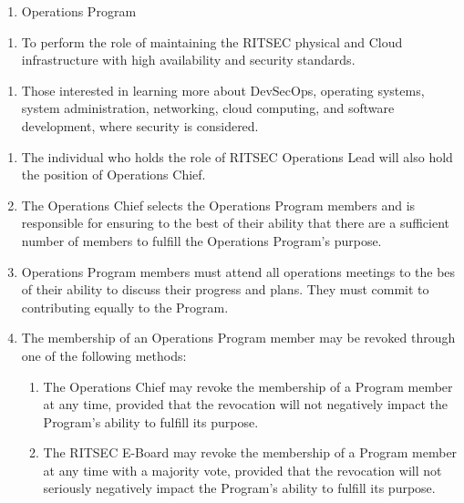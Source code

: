 

\begin{enumerate}
	\item Operations Program
\end{enumerate}


\begin{enumerate}
	\item To perform the role of maintaining the RITSEC physical and Cloud infrastructure
	      with high availability and security standards.
\end{enumerate}


\begin{enumerate}
	\item Those interested in learning more about DevSecOps, operating systems, system
	      administration, networking, cloud computing, and software development, where
	      security is considered.
\end{enumerate}


\begin{enumerate}
	\item The individual who holds the role of RITSEC Operations Lead will also hold the
	      position of Operations Chief.
	\item The Operations Chief selects the Operations Program members and is responsible
	      for ensuring to the best of their ability that there are a sufficient number of
	      members to fulfill the Operations Program's purpose.
	\item Operations Program members must attend all operations meetings to the bes of
	      their ability to discuss their progress and plans. They must commit to
	      contributing equally to the Program.
	\item The membership of an Operations Program member may be revoked through one of
	      the following methods:
	      \begin{enumerate}
		      \item The Operations Chief may revoke the membership of a Program member at any time,
		            provided that the revocation will not negatively impact the Program's ability
		            to fulfill its purpose.
		      \item The RITSEC E-Board may revoke the membership of a Program member at any time
		            with a majority vote, provided that the revocation will not seriously
		            negatively impact the Program's ability to fulfill its purpose.
	      \end{enumerate}
\end{enumerate}